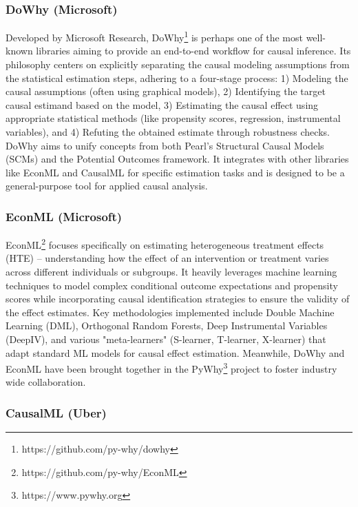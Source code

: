 {{\subsubsection{DoWhy (Microsoft)}

Developed by Microsoft Research, DoWhy\footnote{https://github.com/py-why/dowhy} \cite{sharma2020dowhy} is perhaps one of the most well-known libraries aiming to provide an end-to-end workflow for causal inference. Its philosophy centers on explicitly separating the causal modeling assumptions from the statistical estimation steps, adhering to a four-stage process: 1) Modeling the causal assumptions (often using graphical models), 2) Identifying the target causal estimand based on the model, 3) Estimating the causal effect using appropriate statistical methods (like propensity scores, regression, instrumental variables), and 4) Refuting the obtained estimate through robustness checks. DoWhy aims to unify concepts from both Pearl's Structural Causal Models (SCMs) and the Potential Outcomes framework. It integrates with other libraries like EconML and CausalML for specific estimation tasks and is designed to be a general-purpose tool for applied causal analysis.

\subsubsection{EconML (Microsoft)}

EconML\footnote{https://github.com/py-why/EconML} \cite{oprescu2019econml} focuses specifically on estimating heterogeneous treatment effects (HTE) – understanding how the effect of an intervention or treatment varies across different individuals or subgroups. It heavily leverages machine learning techniques to model complex conditional outcome expectations and propensity scores while incorporating causal identification strategies to ensure the validity of the effect estimates. Key methodologies implemented include Double Machine Learning (DML), Orthogonal Random Forests, Deep Instrumental Variables (DeepIV), and various "meta-learners" (S-learner, T-learner, X-learner) that adapt standard ML models for causal effect estimation. Meanwhile, DoWhy and EconML have been brought together in the PyWhy\footnote{https://www.pywhy.org} project to foster industry wide collaboration. 

\subsubsection{CausalML (Uber)}


}}
